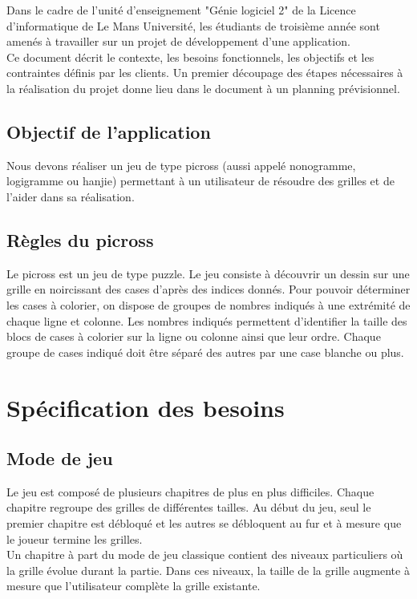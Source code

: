 \documentclass{report}
\begin{document}
		Dans le cadre de l'unité d'enseignement "Génie logiciel 2" de la Licence d'informatique de Le Mans Université, les étudiants de troisième année sont amenés à travailler sur un projet de développement d'une application. \\
		Ce document décrit le contexte, les besoins fonctionnels, les objectifs et les contraintes définis par les clients. Un premier découpage des étapes nécessaires à la réalisation du projet donne lieu dans le document à un planning prévisionnel.

	
 	\section{Objectif de l'application}		
		Nous devons réaliser un jeu de type picross (aussi appelé nonogramme, logigramme ou hanjie) permettant à un utilisateur de résoudre des grilles et de l'aider dans sa réalisation.

	\section{Règles du picross}
		Le picross est un jeu de type puzzle. Le jeu consiste à découvrir un dessin sur une grille en noircissant des cases d'après des indices donnés.	
		Pour pouvoir déterminer les cases à colorier, on dispose de groupes de nombres indiqués à une extrémité de chaque ligne et colonne.
		\newline
		Les nombres indiqués permettent d'identifier la taille des blocs de cases à colorier sur la ligne ou colonne ainsi que leur ordre.
		\newline
		Chaque groupe de cases indiqué doit être séparé des autres par une case blanche ou plus.
	
		
\chapter{Spécification des besoins}

		\section{Mode de jeu}
			Le jeu est composé de plusieurs chapitres de plus en plus difficiles. Chaque chapitre regroupe des grilles de différentes tailles. Au début du jeu, seul le premier chapitre est débloqué et les autres se débloquent au fur et à mesure que le joueur termine les grilles.\\
			Un chapitre à part du mode de jeu classique contient des niveaux particuliers où la grille évolue durant la partie. Dans ces niveaux, la taille de la grille augmente à mesure que l'utilisateur complète la grille existante.
\end{document}
